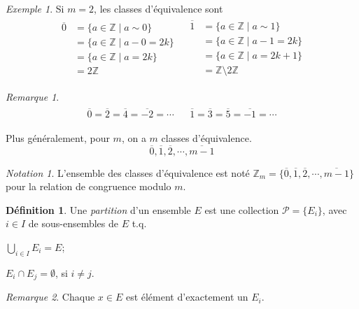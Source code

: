 \documentclass{report}
\newcommand*{\entiers}{\mathbb{Z}}
\theoremstyle{definition}
\newtheorem*{defin}{D\'efinition}
\theoremstyle{remark}
\newtheorem*{exem}{Exemple}
\newtheorem*{nota}{Notation}
\newtheorem*{rema}{Remarque}
\begin{document}
\begin{exem}
		Si $m=2$, les classes d'\'equivalence sont
		\begin{align*}
			\begin{split}
				\overline{0}&= \{a \in \entiers \mid a \sim 0\}\\
				&= \{a \in \entiers \mid a-0=2k\}\\
				&= \{a \in \entiers \mid a=2k\}\\
				&= 2\entiers
			\end{split}
			&
			\begin{split}
				\overline{1}&= \{a \in \entiers \mid a \sim 1\}\\
				&= \{a \in \entiers \mid a-1=2k\}\\
				&= \{a \in \entiers \mid a=2k+1\}\\
				&= \entiers\setminus2\entiers
			\end{split}
		\end{align*}
		\begin{rema}
			\begin{align*}
				\begin{split}
					\overline{0} = \overline{2} = \overline{4} = \overline{-2} = \dotsb
				\end{split}
				&
				\begin{split}
					\overline{1} = \overline{3} = \overline{5} = \overline{-1} = \dotsb
				\end{split}
			\end{align*}
		\end{rema}

		Plus g\'en\'eralement, pour $m$, on a $m$ classes d'\'equivalence.
		\[
		\overline{0}, \overline1, \overline2, \dotsb, \overline{m-1}
		\]
		\begin{nota}
			L'ensemble des classes d'\'equivalence est not\'e $\entiers_m = \{\overline{0}, \overline1, \overline2, \dotsb, \overline{m-1}\}$ pour la relation de congruence modulo $m$.
		\end{nota}
	\end{exem}
	\begin{defin}
		Une \emph{partition} d'un ensemble $E$ est une collection $\mathcal{P} = \{E_i\}$, avec $i \in I$ de sous-ensembles de $E$ t.q.
		\begin{nlist}
			\item $\bigcup\limits_{i \in I} E_i = E$;
			\item $E_i \cap E_j = \emptyset$, si $i \neq j$.
		\end{nlist}
		\begin{rema}
			Chaque $x \in E$ est \'el\'ement d'exactement un $E_i$.
		\end{rema}
	\end{defin}
\end{document}
